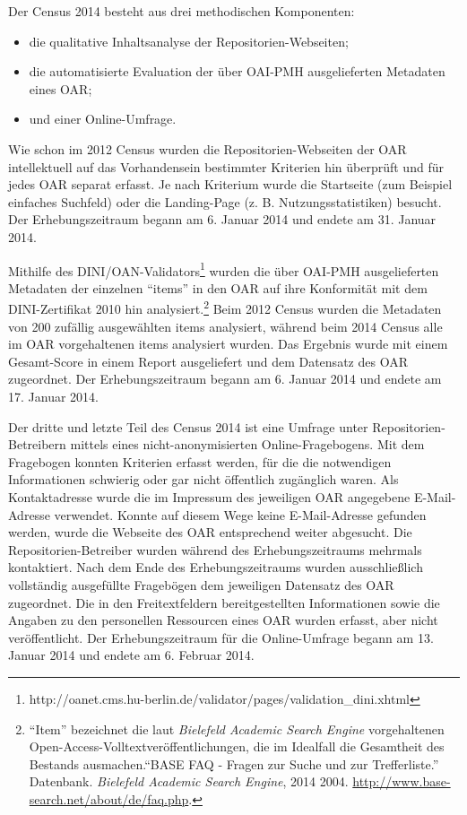 \documentclass[a4paper,
fontsize=11pt,
oneside,
numbers=noperiodatend,
parskip=half-,
bibliography=totoc,
final
]{scrartcl}
\begin{document}
Der Census 2014 besteht aus drei methodischen Komponenten:

\begin{itemize}
\item
  die qualitative Inhaltsanalyse der Repositorien-Webseiten;
\item
  die automatisierte Evaluation der über OAI-PMH ausgelieferten
  Metadaten eines OAR;
\item
  und einer Online-Umfrage.
\end{itemize}

Wie schon im 2012 Census wurden die Repositorien-Webseiten der OAR
intellektuell auf das Vorhandensein bestimmter Kriterien hin überprüft
und für jedes OAR separat erfasst. Je nach Kriterium wurde die
Startseite (zum Beispiel einfaches Suchfeld) oder die Landing-Page (z. B.
Nutzungsstatistiken) besucht. Der Erhebungszeitraum begann am 6. Januar
2014 und endete am 31. Januar 2014.

Mithilfe des DINI/OAN-Validators\footnote{http://oanet.cms.hu-berlin.de/validator/pages/validation\_dini.xhtml}
wurden die über OAI-PMH ausgelieferten Metadaten der einzelnen
\enquote{items} in den OAR auf ihre Konformität mit dem DINI-Zertifikat
2010 hin analysiert.\footnote{\enquote{Item} bezeichnet die laut
  \emph{Bielefeld Academic Search Engine} vorgehaltenen
  Open-Access-Volltextveröffentlichungen, die im Idealfall die
  Gesamtheit des Bestands ausmachen.\enquote{BASE FAQ - Fragen zur Suche
  und zur Trefferliste.} Datenbank. \emph{Bielefeld Academic Search
  Engine}, 2014 2004. \url{http://www.base-search.net/about/de/faq.php}.}
Beim 2012 Census wurden die Metadaten von 200 zufällig ausgewählten
items analysiert, während beim 2014 Census alle im OAR vorgehaltenen
items analysiert wurden. Das Ergebnis wurde mit einem Gesamt-Score in
einem Report ausgeliefert und dem Datensatz des OAR zugeordnet. Der
Erhebungszeitraum begann am 6. Januar 2014 und endete am 17. Januar
2014.

Der dritte und letzte Teil des Census 2014 ist eine Umfrage unter
Repositorien-Betreibern mittels eines nicht-anonymisierten
Online-Fragebogens. Mit dem Fragebogen konnten Kriterien erfasst werden,
für die die notwendigen Informationen schwierig oder gar nicht
öffentlich zugänglich waren. Als Kontaktadresse wurde die im Impressum
des jeweiligen OAR angegebene E-Mail-Adresse verwendet. Konnte auf
diesem Wege keine E-Mail-Adresse gefunden werden, wurde die Webseite des
OAR entsprechend weiter abgesucht. Die Repositorien-Betreiber wurden
während des Erhebungszeitraums mehrmals kontaktiert. Nach dem Ende des
Erhebungszeitraums wurden ausschließlich vollständig ausgefüllte
Fragebögen dem jeweiligen Datensatz des OAR zugeordnet. Die in den
Freitextfeldern bereitgestellten Informationen sowie die Angaben zu den
personellen Ressourcen eines OAR wurden erfasst, aber nicht
veröffentlicht. Der Erhebungszeitraum für die Online-Umfrage begann am
13. Januar 2014 und endete am 6. Februar 2014.
\end{document}
